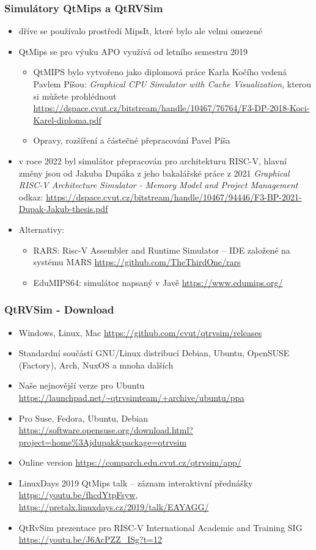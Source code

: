\begin{frame}
\frametitle{Simulátory QtMips a QtRVSim}

\begin{itemize}
\item dříve se používalo prostředí MipsIt, které bylo ale velmi omezené
\item QtMips se pro výuku APO využívá od letního semestru 2019
\begin{itemize}
\item QtMIPS bylo vytvořeno jako diplomová práce Karla Kočího vedená Pavlem Píšou: \textit{Graphical CPU Simulator with Cache Visualization}, kterou si můžete prohlédnout \url{https://dspace.cvut.cz/bitstream/handle/10467/76764/F3-DP-2018-Koci-Karel-diploma.pdf}
\item Opravy, rozšíření a částečné přepracování Pavel Píša
\end{itemize}
\item v roce 2022 byl simulátor přepracován pro architekturu RISC-V, hlavní změny jsou od Jakuba Dupáka z jeho bakalářské práce z 2021 \textit{Graphical RISC-V Architecture Simulator - Memory Model and Project Management} odkaz: \url{https://dspace.cvut.cz/bitstream/handle/10467/94446/F3-BP-2021-Dupak-Jakub-thesis.pdf}
\item Alternativy:
\begin{itemize}
 \item RARS: Risc-V Assembler and Runtime Simulator -- IDE založené na systému MARS \url{https://github.com/TheThirdOne/rars}
 \item EduMIPS64: simulátor napsaný v Javě \url{https://www.edumips.org/}
\end{itemize}
\end{itemize}

\end{frame}


\begin{frame}
\frametitle{QtRVSim - Download}
\begin{itemize}
\item Windows, Linux, Mac \url{https://github.com/cvut/qtrvsim/releases}
\item Standardní součástí GNU/Linux distribucí Debian, Ubuntu, OpenSUSE (Factory), Arch, NuxOS a mnoha dalších
\item Naše nejnovější verze pro Ubuntu \url{https://launchpad.net/~qtrvsimteam/+archive/ubuntu/ppa}
\item Pro Suse, Fedora, Ubuntu, Debian  \url{https://software.opensuse.org/download.html?project=home\%3Ajdupak\&package=qtrvsim}
\item Online version \url{https://comparch.edu.cvut.cz/qtrvsim/app/}
\item LinuxDays 2019 QtMips talk – záznam interaktivní přednášky \url{https://youtu.be/fhcdYtpFsyw}, \url{https://pretalx.linuxdays.cz/2019/talk/EAYAGG/}
\item QtRvSim prezentace pro RISC-V International Academic and Training SIG \url{https://youtu.be/J6AcPZZ_ISg?t=12}
\end{itemize}
\end{frame}
